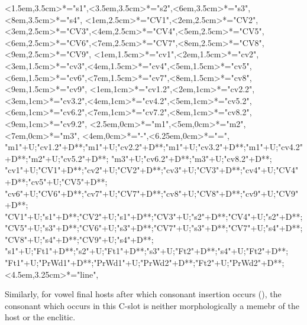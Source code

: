 \begin{multicols}{2}
\begin{exe}
{\begin{xlist}
{<1.5em,3.5cm>*="s1",<3.5em,3.5cm>*="s2",<6em,3.5cm>*="s3",<8em,3.5cm>*="s4",
		<1em,2.5cm>*="CV1",<2em,2.5cm>*="CV2",<3em,2.5cm>*="CV3",<4em,2.5cm>*="CV4",<5em,2.5cm>*="CV5",
		<6em,2.5cm>*="CV6",<7em,2.5cm>*="CV7",<8em,2.5cm>*="CV8",<9em,2.5cm>*="CV9",
		<1em,1.5cm>*="cv1",<2em,1.5cm>*="cv2",<3em,1.5cm>*="cv3",<4em,1.5cm>*="cv4",<5em,1.5cm>*="cv5",
		<6em,1.5cm>*="cv6",<7em,1.5cm>*\as{ }="cv7",<8em,1.5cm>*="cv8",<9em,1.5cm>*\as{ }="cv9",
		<1em,1cm>*="cv1.2",<2em,1cm>*="cv2.2",<3em,1cm>*="cv3.2",<4em,1cm>*="cv4.2",<5em,1cm>*="cv5.2",
		<6em,1cm>*="cv6.2",<7em,1cm>*\as{ }="cv7.2",<8em,1cm>*="cv8.2",<9em,1cm>*\as{ }="cv9.2",
		<2.5em,0cm>*="m1",<5em,0cm>*="m2",<7em,0cm>*="m3",
		<4em,0cm>*\as{-}="-",<6.25em,0cm>*\as{=}="=",
		"m1"+U;"cv1.2"+D**\dir{-};"m1"+U;"cv2.2"+D**\dir{-};"m1"+U;"cv3.2"+D**\dir{-};"m1"+U;"cv4.2"+D**\dir{-};"m2"+U;"cv5.2"+D**\dir{-};
		"m3"+U;"cv6.2"+D**\dir{-};"m3"+U;"cv8.2"+D**\dir{-};
		"cv1"+U;"CV1"+D**\dir{-};"cv2"+U;"CV2"+D**\dir{-};"cv3"+U;"CV3"+D**\dir{-};"cv4"+U;"CV4"+D**\dir{-};"cv5"+U;"CV5"+D**\dir{-};
		"cv6"+U;"CV6"+D**\dir{-};"cv7"+U;"CV7"+D**\dir{};"cv8"+U;"CV8"+D**\dir{-};"cv9"+U;"CV9"+D**\dir{};
		"CV1"+U;"s1"+D**\dir{-};"CV2"+U;"s1"+D**\dir{-};"CV3"+U;"s2"+D**\dir{-};"CV4"+U;"s2"+D**\dir{-};
		"CV5"+U;"s3"+D**\dir{-};"CV6"+U;"s3"+D**\dir{-};"CV7"+U;"s3"+D**\dir{-};"CV7"+U;"s4"+D**\dir{-};"CV8"+U;"s4"+D**\dir{-};"CV9"+U;"s4"+D**\dir{-};
		"s1"+U;"Ft1"+D**\dir{-};"s2"+U;"Ft1"+D**\dir{-};"s3"+U;"Ft2"+D**\dir{-};"s4"+U;"Ft2"+D**\dir{-};
		"Ft1"+U;"PrWd1"+D**\dir{-};"PrWd1"+U;"PrWd2"+D**\dir{-};"Ft2"+U;"PrWd2"+D**\dir{-};
		<4.5em,3.25cm>*="line",
	\endxy}\label{as:moin-t=ee}
	\end{xlist}}
\end{exe}
\end{multicols}

Similarly, for vowel final hosts after which consonant insertion occurs (),
the consonant which occurs in this C-slot is neither morphologically a
memebr of the host or the enclitic.